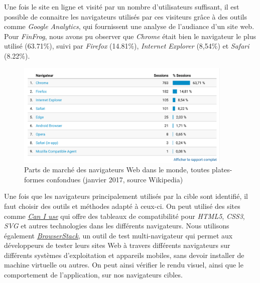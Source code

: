 \documentclass[12pt,a4paper]{article}
\begin{document}
  \bigskip

  Une fois le site en ligne et visité par un nombre d'utilisateurs
  suffisant, il est possible de connaitre les navigateurs utilisés par ces
  visiteurs grâce à des outils comme \emph{Google Analytics}, qui
  fournissent une analyse de l'audiance d'un site web. Pour
  \emph{FinFrog}, nous avons pu observer que \emph{Chrome} était bien le
  navigateur le plus utilisé (63.71\%), suivi par \emph{Firefox}
  (14.81\%), \emph{Internet Explorer} (8,54\%) et \emph{Safari} (8.22\%).

  \begin{figure}[h]
    \centering
    \includegraphics[height=5cm]{figures/FF-browsers.png}
    \caption{Parts de marché des navigateurs Web dans le monde, toutes plates-formes confondues (janvier 2017, source Wikipedia)}
  \end{figure}

  \bigskip

  Une fois que les navigateurs principalement utilisés par la cible sont
  identifié, il faut choisir des outils et méthodes adapté à ceux-ci. On
  peut utilisé des sites comme \href{http://caniuse.com/}{\emph{Can I
  use}} qui offre des tableaux de compatibilité pour \emph{HTML5},
  \emph{CSS3}, \emph{SVG} et autres technologies dans les différents
  navigateurs. Nous utilisons également
  \href{https://www.browserstack.com/}{\emph{BrowserStack}}, un outil de
  test multi-navigateur qui permet aux développeurs de tester leurs sites
  Web à travers différents navigateurs sur différents systèmes
  d'exploitation et appareils mobiles, sans devoir installer de machine
  virtuelle ou autres. On peut ainsi vérifier le rendu visuel, ainsi que
  le comportement de l'application, sur nos navigateurs cibles.

  \bigskip
\end{document}
